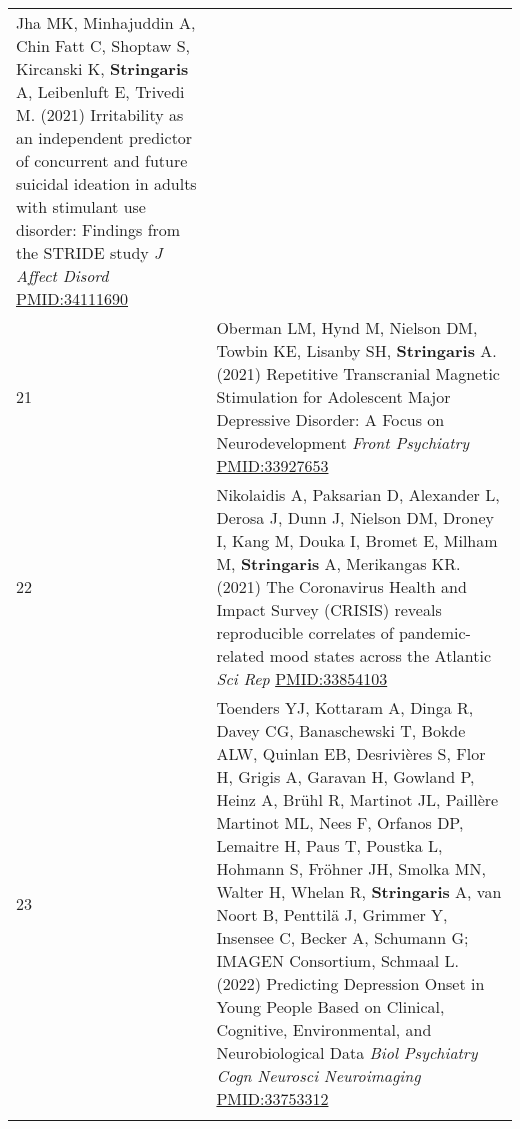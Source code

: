 \documentclass[
]{article}
\begin{document}
\begin{longtable}[]{@{}ll@{}}
\begin{minipage}[t]{0.94\columnwidth}
Jha MK, Minhajuddin A, Chin Fatt C, Shoptaw S, Kircanski K,
\textbf{Stringaris} A, Leibenluft E, Trivedi M. (2021) Irritability as
an independent predictor of concurrent and future suicidal ideation in
adults with stimulant use disorder: Findings from the STRIDE study
\emph{J Affect Disord} \url{PMID:34111690}\strut
\end{minipage}\tabularnewline
\begin{minipage}[t]{0.01\columnwidth}\raggedright
21\strut
\end{minipage} & \begin{minipage}[t]{0.94\columnwidth}\raggedright
Oberman LM, Hynd M, Nielson DM, Towbin KE, Lisanby SH,
\textbf{Stringaris} A. (2021) Repetitive Transcranial Magnetic
Stimulation for Adolescent Major Depressive Disorder: A Focus on
Neurodevelopment \emph{Front Psychiatry} \url{PMID:33927653}\strut
\end{minipage}\tabularnewline
\begin{minipage}[t]{0.01\columnwidth}\raggedright
22\strut
\end{minipage} & \begin{minipage}[t]{0.94\columnwidth}\raggedright
Nikolaidis A, Paksarian D, Alexander L, Derosa J, Dunn J, Nielson DM,
Droney I, Kang M, Douka I, Bromet E, Milham M, \textbf{Stringaris} A,
Merikangas KR. (2021) The Coronavirus Health and Impact Survey (CRISIS)
reveals reproducible correlates of pandemic-related mood states across
the Atlantic \emph{Sci Rep} \url{PMID:33854103}\strut
\end{minipage}\tabularnewline
\begin{minipage}[t]{0.01\columnwidth}\raggedright
23\strut
\end{minipage} & \begin{minipage}[t]{0.94\columnwidth}\raggedright
Toenders YJ, Kottaram A, Dinga R, Davey CG, Banaschewski T, Bokde ALW,
Quinlan EB, Desrivières S, Flor H, Grigis A, Garavan H, Gowland P, Heinz
A, Brühl R, Martinot JL, Paillère Martinot ML, Nees F, Orfanos DP,
Lemaitre H, Paus T, Poustka L, Hohmann S, Fröhner JH, Smolka MN, Walter
H, Whelan R, \textbf{Stringaris} A, van Noort B, Penttilä J, Grimmer Y,
Insensee C, Becker A, Schumann G; IMAGEN Consortium, Schmaal L. (2022)
Predicting Depression Onset in Young People Based on Clinical,
Cognitive, Environmental, and Neurobiological Data \emph{Biol Psychiatry
Cogn Neurosci Neuroimaging} \url{PMID:33753312}\strut
\end{minipage}\tabularnewline
\begin{minipage}[t]{0.01\columnwidth}\raggedright

\end{minipage}
\end{longtable}
\end{document}
